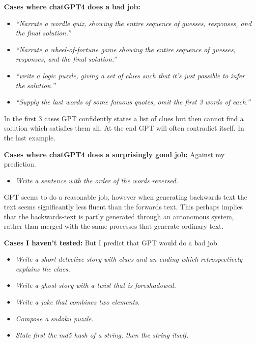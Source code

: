\documentclass[
  11pt,
  letterpaper,
  DIV=11,
  numbers=noendperiod,
  oneside]{scrartcl}
\providecommand{\tightlist}{%
  \setlength{\itemsep}{0pt}\setlength{\parskip}{0pt}}\usepackage{longtable,booktabs,array}
\begin{document}
\textbf{Cases where chatGPT4 does a bad job:}

\begin{itemize}
\tightlist
\item
  \emph{``Narrate a wordle quiz, showing the entire sequence of guesses,
  responses, and the final solution.''}
\item
  \emph{``Narrate a wheel-of-fortune game showing the entire sequence of
  guesses, responses, and the final solution.''}
\item
  \emph{``write a logic puzzle, giving a set of clues such that it's
  just possible to infer the solution.''}
\item
  \emph{``Supply the last words of some famous quotes, omit the first 3
  words of each.''}
\end{itemize}

In the first 3 cases GPT confidently states a list of clues but then
cannot find a solution which satisfies them all. At the end GPT will
often contradict itself. In the last example.

\textbf{Cases where chatGPT4 does a surprisingly good job:} Against my
prediction.

\begin{itemize}
\tightlist
\item
  \emph{Write a sentence with the order of the words reversed.}
\end{itemize}

GPT seems to do a reasonable job, however when generating backwards text
the text seems significantly less fluent than the forwards text. This
perhaps implies that the backwards-text is partly generated through an
autonomous system, rather than merged with the same processes that
generate ordinary text.

\textbf{Cases I haven't tested:} But I predict that GPT would do a bad
job.

\begin{itemize}
\tightlist
\item
  \emph{Write a short detective story with clues and an ending which
  retrospectively explains the clues.}
\item
  \emph{Write a ghost story with a twist that is foreshadowed.}
\item
  \emph{Write a joke that combines two elements.}
\item
  \emph{Compose a sudoku puzzle.}
\item
  \emph{State first the md5 hash of a string, then the string itself.}
\end{itemize}
\end{document}
